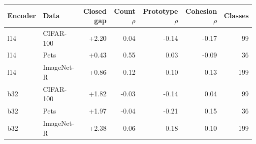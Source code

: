 \begin{tabular}{@{}llrrrrr@{}}
\toprule
Encoder & Data & Closed gap & Count $\rho$ & Prototype $\rho$ & Cohesion $\rho$ & Classes \\
\midrule
l14 & CIFAR-100 & +2.20 & 0.04 & -0.14 & -0.17 & 99 \\
l14 & Pets & +0.43 & 0.55 & 0.03 & -0.09 & 36 \\
l14 & ImageNet-R & +0.86 & -0.12 & -0.10 & 0.13 & 199 \\
b32 & CIFAR-100 & +1.82 & -0.03 & -0.14 & 0.04 & 99 \\
b32 & Pets & +1.97 & -0.04 & -0.21 & 0.15 & 36 \\
b32 & ImageNet-R & +2.38 & 0.06 & 0.18 & 0.10 & 199 \\
\bottomrule
\end{tabular}
